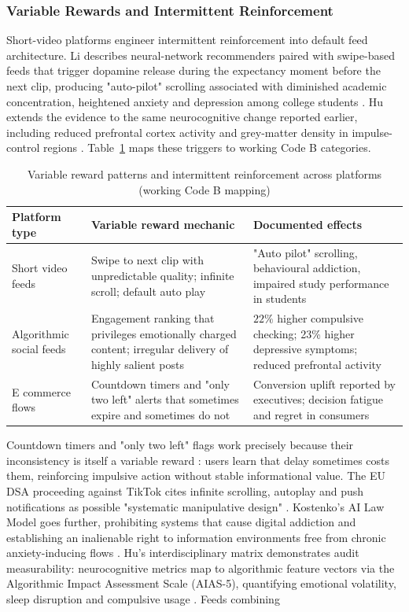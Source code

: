 \documentclass[11pt]{article}
\begin{document}
\subsubsection{Variable Rewards and Intermittent Reinforcement}
\label{sec:variable_rewards_intermittent} Short-video platforms engineer intermittent reinforcement into default feed architecture. Li describes neural-network recommenders paired with swipe-based feeds that trigger dopamine release during the expectancy moment before the next clip, producing "auto-pilot" scrolling associated with diminished academic concentration, heightened anxiety and depression among college students \parencites[2]{8958037}[3]{8958037}[6]{8958037}. Hu extends the evidence to the same neurocognitive change reported earlier, including reduced prefrontal cortex activity and grey-matter density in impulse-control regions \parencites[2]{3303310}[20]{3303310}. Table~\ref{tab:vr_patterns} maps these triggers to working Code B categories. \begin{table}[H] \centering \caption{Variable reward patterns and intermittent reinforcement across platforms (working Code B mapping)} \label{tab:vr_patterns} \begin{tabular}{p{3.2cm}p{4.8cm}p{4.8cm}} \hline Platform type & Variable reward mechanic & Documented effects \\ \hline Short video feeds & Swipe to next clip with unpredictable quality; infinite scroll; default auto play & "Auto pilot" scrolling, behavioural addiction, impaired study performance in students \parencites[2]{8958037}[6]{8958037} \\ Algorithmic social feeds & Engagement ranking that privileges emotionally charged content; irregular delivery of highly salient posts & $22\%$ higher compulsive checking; 23\% higher depressive symptoms; reduced prefrontal activity \parencites[2]{3303310}[20]{3303310} \\ E commerce flows & Countdown timers and "only two left" alerts that sometimes expire and sometimes do not & Conversion uplift reported by executives; decision fatigue and regret in consumers \parencites[136]{8745065}[8]{6295677} \\ \hline \end{tabular} \end{table} Countdown timers and "only two left" flags work precisely because their inconsistency is itself a variable reward \parencites[136]{8745065}[7]{6295677}: users learn that delay sometimes costs them, reinforcing impulsive action without stable informational value. The EU DSA proceeding against TikTok cites infinite scrolling, autoplay and push notifications as possible "systematic manipulative design" \parencites[2]{8958037}. Kostenko's AI Law Model goes further, prohibiting systems that cause digital addiction and establishing an inalienable right to information environments free from chronic anxiety-inducing flows \parencites[61--62]{2977039}[119]{2977039}. Hu's interdisciplinary matrix demonstrates audit measurability: neurocognitive metrics map to algorithmic feature vectors via the Algorithmic Impact Assessment Scale (AIAS-5), quantifying emotional volatility, sleep disruption and compulsive usage \parencites[19]{3303310}[20]{3303310}. Feeds combining 
\end{document}

